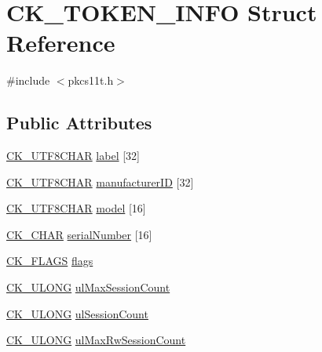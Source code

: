 \hypertarget{struct_c_k___t_o_k_e_n___i_n_f_o}{}\section{C\+K\+\_\+\+T\+O\+K\+E\+N\+\_\+\+I\+N\+FO Struct Reference}
\label{struct_c_k___t_o_k_e_n___i_n_f_o}


{\ttfamily \#include $<$pkcs11t.\+h$>$}

\subsection*{Public Attributes}
\begin{DoxyCompactItemize}
\item 
\hyperlink{pkcs11t_8h_a0b0f8118c33f8a96a6af834bbab1df0c}{C\+K\+\_\+\+U\+T\+F8\+C\+H\+AR} \hyperlink{struct_c_k___t_o_k_e_n___i_n_f_o_a2d141d73cfecdc4b5012e239b465f37f}{label} \mbox{[}32\mbox{]}
\item 
\hyperlink{pkcs11t_8h_a0b0f8118c33f8a96a6af834bbab1df0c}{C\+K\+\_\+\+U\+T\+F8\+C\+H\+AR} \hyperlink{struct_c_k___t_o_k_e_n___i_n_f_o_a0646cf40221dac457ea5b049f5a0f3b5}{manufacturer\+ID} \mbox{[}32\mbox{]}
\item 
\hyperlink{pkcs11t_8h_a0b0f8118c33f8a96a6af834bbab1df0c}{C\+K\+\_\+\+U\+T\+F8\+C\+H\+AR} \hyperlink{struct_c_k___t_o_k_e_n___i_n_f_o_a3a1af28eecdf49884252468fc2aa9005}{model} \mbox{[}16\mbox{]}
\item 
\hyperlink{pkcs11t_8h_a0ed4ef152a55e26f435b876927145580}{C\+K\+\_\+\+C\+H\+AR} \hyperlink{struct_c_k___t_o_k_e_n___i_n_f_o_a139c0665509edcb172f5dd0b7ba6933e}{serial\+Number} \mbox{[}16\mbox{]}
\item 
\hyperlink{pkcs11t_8h_a53850492c1ba57aca4332be791a3c6a3}{C\+K\+\_\+\+F\+L\+A\+GS} \hyperlink{struct_c_k___t_o_k_e_n___i_n_f_o_a6b28ba5e0098ddc36938fcf2d6edff25}{flags}
\item 
\hyperlink{pkcs11t_8h_a35181858a3b7a0a81f49d180d8f446ef}{C\+K\+\_\+\+U\+L\+O\+NG} \hyperlink{struct_c_k___t_o_k_e_n___i_n_f_o_ad7a6ec88e7857ec6eeb0d0cebb3e05d4}{ul\+Max\+Session\+Count}
\item 
\hyperlink{pkcs11t_8h_a35181858a3b7a0a81f49d180d8f446ef}{C\+K\+\_\+\+U\+L\+O\+NG} \hyperlink{struct_c_k___t_o_k_e_n___i_n_f_o_a3f40583f6aa0e3aba1ac591b34b6fafd}{ul\+Session\+Count}
\item 
\hyperlink{pkcs11t_8h_a35181858a3b7a0a81f49d180d8f446ef}{C\+K\+\_\+\+U\+L\+O\+NG} \hyperlink{struct_c_k___t_o_k_e_n___i_n_f_o_a3cc3adab228a5db230028a37a77d2db2}{ul\+Max\+Rw\+Session\+Count}

\end{DoxyCompactItemize}
